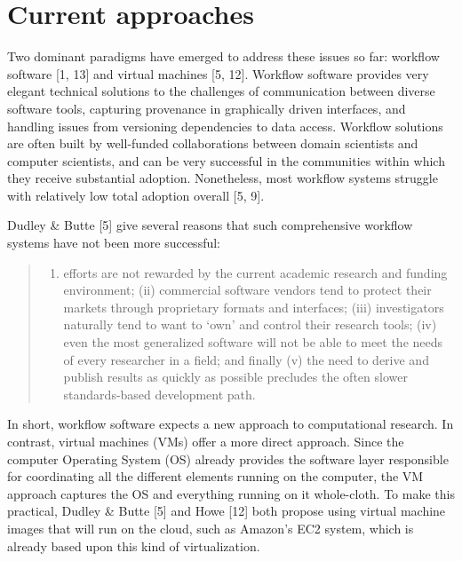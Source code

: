 \documentclass[9pt]{components/acm_proc_article-sp}
\begin{document}
\section{Current approaches}\label{current-approaches}

Two dominant paradigms have emerged to address these issues so far:
workflow software {[}1, 13{]} and virtual machines {[}5, 12{]}. Workflow
software provides very elegant technical solutions to the challenges of
communication between diverse software tools, capturing provenance in
graphically driven interfaces, and handling issues from versioning
dependencies to data access. Workflow solutions are often built by
well-funded collaborations between domain scientists and computer
scientists, and can be very successful in the communities within which
they receive substantial adoption. Nonetheless, most workflow systems
struggle with relatively low total adoption overall {[}5, 9{]}.

Dudley \& Butte {[}5{]} give several reasons that such comprehensive
workflow systems have not been more successful:

\begin{quote}
\begin{enumerate}
\def\labelenumi{(\roman{enumi})}
\itemsep1pt\parskip0pt
\item
  efforts are not rewarded by the current academic research and funding
  environment; (ii) commercial software vendors tend to protect their
  markets through proprietary formats and interfaces; (iii)
  investigators naturally tend to want to `own' and control their
  research tools; (iv) even the most generalized software will not be
  able to meet the needs of every researcher in a field; and finally (v)
  the need to derive and publish results as quickly as possible
  precludes the often slower standards-based development path.
\end{enumerate}
\end{quote}

In short, workflow software expects a new approach to computational
research. In contrast, virtual machines (VMs) offer a more direct
approach. Since the computer Operating System (OS) already provides the
software layer responsible for coordinating all the different elements
running on the computer, the VM approach captures the OS and everything
running on it whole-cloth. To make this practical, Dudley \& Butte
{[}5{]} and Howe {[}12{]} both propose using virtual machine images that
will run on the cloud, such as Amazon's EC2 system, which is already
based upon this kind of virtualization.
\end{document}
